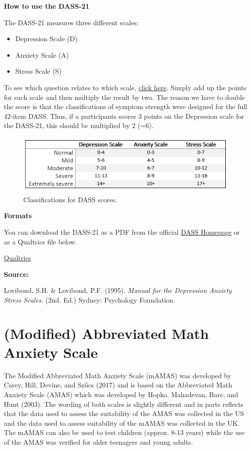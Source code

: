 \documentclass[
]{book}
\providecommand{\tightlist}{%
  \setlength{\itemsep}{0pt}\setlength{\parskip}{0pt}}
\begin{document}
\textbf{How to use the DASS-21}

The DASS-21 measures three different scales:

\begin{itemize}
\tightlist
\item
  Depression Scale (D)
\item
  Anxiety Scale (A)
\item
  Stress Scale (S)
\end{itemize}

To see which question relates to which scale, \href{link}{click here}. Simply add up the points for each scale and then multiply the result by two. The reason we have to double the score is that the classifications of symptom strength were designed for the full 42-item DASS. Thus, if a participants scores 3 points on the Depression scale for the DASS-21, this should be multiplied by 2 (=6).

\begin{figure}

{\centering \includegraphics[width=0.8\linewidth]{images/DASS_Scoring} 

}

\caption{Classifications for DASS scores.}\label{fig:Figure8-1}
\end{figure}

\textbf{Formats}

You can download the DASS-21 as a PDF from the official \href{http://www2.psy.unsw.edu.au/groups/dass/}{DASS Homepage} or as a Qualtrics file below.

\href{link}{Qualtrics}

\textbf{Source:}

Lovibond, S.H. \& Lovibond, P.F. (1995). \emph{Manual for the Depression Anxiety Stress Scales.} (2nd. Ed.) Sydney: Psychology Foundation.

\hypertarget{modified-abbreviated-math-anxiety-scale}{%
\section{(Modified) Abbreviated Math Anxiety Scale}\label{modified-abbreviated-math-anxiety-scale}}

The Modified Abbreviated Math Anxiety Scale (mAMAS) was developed by Carey, Hill, Devine, and Szűcs (2017) and is based on the Abbreviated Math Anxiety Scale (AMAS) which was developed by Hopko, Mahadevan, Bare, and Hunt (2003). The wording of both scales is slightly different and in parts reflects that the data used to assess the suitability of the AMAS was collected in the US and the data used to assess suitability of the mAMAS was collected in the UK. The mAMAS can also be used to test children (approx. 8-13 years) while the use of the AMAS was verified for older teenagers and young adults.
\end{document}

